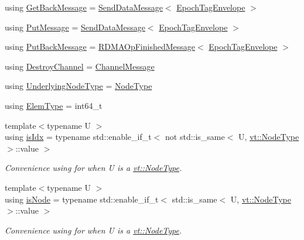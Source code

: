 \begin{DoxyCompactItemize}
\item 
using \hyperlink{namespacevt_1_1rdma_a72a94b92eba75ec9fec43b2a9a4ad878}{Get\+Back\+Message} = \hyperlink{structvt_1_1rdma_1_1_send_data_message}{Send\+Data\+Message}$<$ \hyperlink{namespacevt_af23b58014ced6898422213a0e5e6a27a}{Epoch\+Tag\+Envelope} $>$
\item 
using \hyperlink{namespacevt_1_1rdma_ae0a0330c647ec5ac5d508750f4cd4a06}{Put\+Message} = \hyperlink{structvt_1_1rdma_1_1_send_data_message}{Send\+Data\+Message}$<$ \hyperlink{namespacevt_af23b58014ced6898422213a0e5e6a27a}{Epoch\+Tag\+Envelope} $>$
\item 
using \hyperlink{namespacevt_1_1rdma_a07a52401fe8185d190371b3333dc61ac}{Put\+Back\+Message} = \hyperlink{structvt_1_1rdma_1_1_r_d_m_a_op_finished_message}{R\+D\+M\+A\+Op\+Finished\+Message}$<$ \hyperlink{namespacevt_af23b58014ced6898422213a0e5e6a27a}{Epoch\+Tag\+Envelope} $>$
\item 
using \hyperlink{namespacevt_1_1rdma_a1273aeddd73c1ffac0d7383ef7a314d8}{Destroy\+Channel} = \hyperlink{structvt_1_1rdma_1_1_channel_message}{Channel\+Message}
\item 
using \hyperlink{namespacevt_1_1rdma_a20d01bc82b95453c162d4b9857a4a78a}{Underlying\+Node\+Type} = \hyperlink{namespacevt_a866da9d0efc19c0a1ce79e9e492f47e2}{Node\+Type}
\item 
using \hyperlink{namespacevt_1_1rdma_a38e310504e675aa1bcaf7811019b0df2}{Elem\+Type} = int64\+\_\+t
\item 
{\footnotesize template$<$typename U $>$ }\\using \hyperlink{namespacevt_1_1rdma_a5d8207f84dcd5b5115d78f295f9b6382}{is\+Idx} = typename std\+::enable\+\_\+if\+\_\+t$<$ not std\+::is\+\_\+same$<$ U, \hyperlink{namespacevt_a866da9d0efc19c0a1ce79e9e492f47e2}{vt\+::\+Node\+Type} $>$\+::value $>$
\begin{DoxyCompactList}\small\item\em Convenience using for when U is a \hyperlink{namespacevt_a866da9d0efc19c0a1ce79e9e492f47e2}{vt\+::\+Node\+Type}. \end{DoxyCompactList}\item 
{\footnotesize template$<$typename U $>$ }\\using \hyperlink{namespacevt_1_1rdma_afeb91b098997f8b9e16bbcfba8651a1d}{is\+Node} = typename std\+::enable\+\_\+if\+\_\+t$<$ std\+::is\+\_\+same$<$ U, \hyperlink{namespacevt_a866da9d0efc19c0a1ce79e9e492f47e2}{vt\+::\+Node\+Type} $>$\+::value $>$
\begin{DoxyCompactList}\small\item\em Convenience using for when U is a \hyperlink{namespacevt_a866da9d0efc19c0a1ce79e9e492f47e2}{vt\+::\+Node\+Type}. \end{DoxyCompactList}\end{DoxyCompactItemize}
